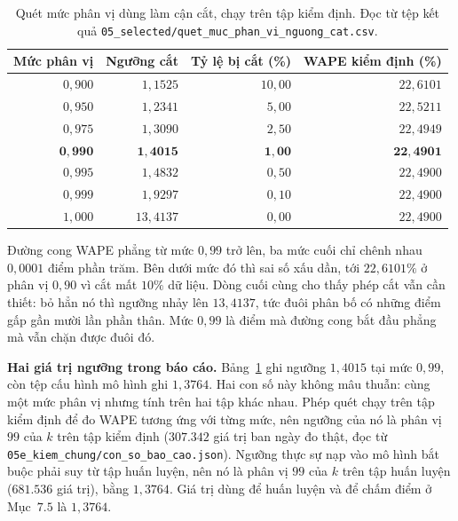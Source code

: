 \documentclass[12pt, a4paper]{report}
\begin{document}
\begin{table}[htbp]
\centering
\caption{Quét mức phân vị dùng làm cận cắt, chạy trên \textbf{tập kiểm định}. Đọc từ tệp kết
quả \texttt{05\_selected/quet\_muc\_phan\_vi\_nguong\_cat.csv}.}
\label{tab:quet_phan_vi}
\small
\begin{tabular}{r r r r}
\toprule
\textbf{Mức phân vị} & \textbf{Ngưỡng cắt} & \textbf{Tỷ lệ bị cắt (\%)} & \textbf{WAPE kiểm định (\%)} \\
\midrule
$0{,}900$ & $1{,}1525$ & $10{,}00$ & $22{,}6101$ \\
$0{,}950$ & $1{,}2341$ & $5{,}00$  & $22{,}5211$ \\
$0{,}975$ & $1{,}3090$ & $2{,}50$  & $22{,}4949$ \\
$\mathbf{0{,}990}$ & $\mathbf{1{,}4015}$ & $\mathbf{1{,}00}$ & $\mathbf{22{,}4901}$ \\
$0{,}995$ & $1{,}4832$ & $0{,}50$  & $22{,}4900$ \\
$0{,}999$ & $1{,}9297$ & $0{,}10$  & $22{,}4900$ \\
$1{,}000$ & $13{,}4137$ & $0{,}00$ & $22{,}4900$ \\
\bottomrule
\end{tabular}
\caption[Quét mức phân vị dùng làm cận cắt, chạy trên tập kiểm định]{Quét mức phân vị dùng làm cận cắt, chạy trên tập kiểm định. Đọc từ tệp kết
quả \texttt{05\_selected/quet\_muc\_phan\_vi\_nguong\_cat.csv}.}
\label{tab:quet_phan_vi}
\end{table}

Đường cong WAPE phẳng từ mức $0{,}99$ trở lên, ba mức cuối chỉ chênh nhau $0{,}0001$ điểm
phần trăm. Bên dưới mức đó thì sai số xấu dần, tới $22{,}6101\%$ ở phân vị $0{,}90$ vì cắt mất
$10\%$ dữ liệu. Dòng cuối cùng cho thấy phép cắt vẫn cần thiết: bỏ hẳn nó thì ngưỡng nhảy
lên $13{,}4137$, tức đuôi phân bố có những điểm gấp gần mười lần phần thân. Mức $0{,}99$ là
điểm mà đường cong bắt đầu phẳng mà vẫn chặn được đuôi đó.

\textbf{Hai giá trị ngưỡng trong báo cáo.} Bảng~\ref{tab:quet_phan_vi} ghi ngưỡng $1{,}4015$
tại mức $0{,}99$, còn tệp cấu hình mô hình ghi $1{,}3764$. Hai con số này không mâu thuẫn: cùng
một mức phân vị nhưng tính trên hai tập khác nhau. Phép quét chạy trên tập kiểm định để đo WAPE
tương ứng với từng mức, nên ngưỡng của nó là phân vị $99$ của $k$ trên tập kiểm định
($307.342$ giá trị ban ngày đo thật, đọc từ
\texttt{05e\_kiem\_chung/con\_so\_bao\_cao.json}). Ngưỡng thực sự nạp vào mô hình bắt buộc phải suy từ tập huấn
luyện, nên nó là phân vị $99$ của $k$ trên tập huấn luyện ($681.536$ giá trị), bằng $1{,}3764$.
Giá trị dùng để huấn luyện và để chấm điểm ở Mục~$7.5$ là $1{,}3764$.
\end{document}
